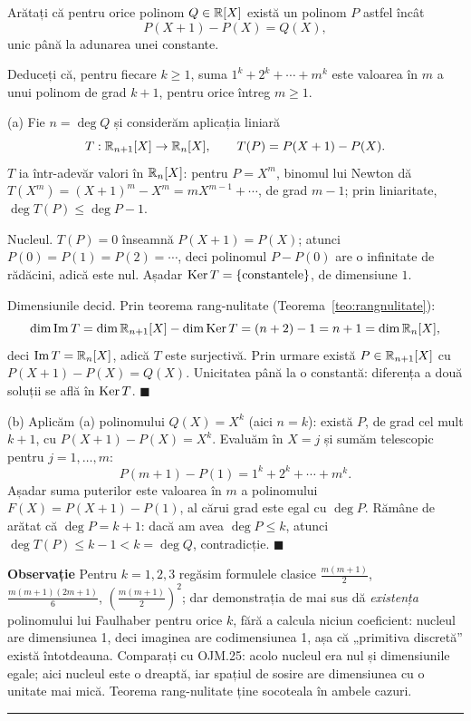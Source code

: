 \begin{parti}
\item Arătați că pentru orice polinom $Q \in \mathbb{R}[X]$ există un polinom $P$ astfel încât
\[
P(X+1) - P(X) = Q(X),
\]
unic până la adunarea unei constante.

\item Deduceți că, pentru fiecare $k \geq 1$, suma $1^k + 2^k + \cdots + m^k$ este valoarea în $m$ a unui polinom de grad $k+1$, pentru orice întreg $m \geq 1$.
\end{parti}
\sol (a) Fie $n = \deg Q$ și considerăm aplicația liniară
\[
T : \mathbb{R}_{n+1}[X] \to \mathbb{R}_n[X], \qquad T(P) = P(X+1) - P(X).
\]
$T$ ia într-adevăr valori în $\mathbb{R}_n[X]$: pentru $P = X^m$, binomul lui Newton dă $T(X^m) = (X+1)^m - X^m = mX^{m-1} + \cdots$, de grad $m-1$; prin liniaritate, $\deg T(P) \leq \deg P - 1$.

Nucleul. $T(P) = 0$ înseamnă $P(X+1) = P(X)$; atunci $P(0) = P(1) = P(2) = \cdots$, deci polinomul $P - P(0)$ are o infinitate de rădăcini, adică este nul. Așadar $\operatorname{Ker} T = \{\text{constantele}\}$, de dimensiune $1$.

Dimensiunile decid. Prin teorema rang-nulitate (Teorema~\ref{teo:rangnulitate}):
\[
\dim \operatorname{Im} T = \dim \mathbb{R}_{n+1}[X] - \dim \operatorname{Ker} T = (n+2) - 1 = n+1 = \dim \mathbb{R}_n[X],
\]
deci $\operatorname{Im} T = \mathbb{R}_n[X]$, adică $T$ este surjectivă. Prin urmare există $P \in \mathbb{R}_{n+1}[X]$ cu $P(X+1) - P(X) = Q(X)$. Unicitatea până la o constantă: diferența a două soluții se află în $\operatorname{Ker} T$. $\blacksquare$

(b) Aplicăm (a) polinomului $Q(X) = X^k$ (aici $n = k$): există $P$, de grad cel mult $k+1$, cu $P(X+1) - P(X) = X^k$. Evaluăm în $X = j$ și sumăm telescopic pentru $j = 1, \ldots, m$:
\[
P(m+1) - P(1) = 1^k + 2^k + \cdots + m^k .
\]
Așadar suma puterilor este valoarea în $m$ a polinomului $F(X) = P(X+1) - P(1)$, al cărui grad este egal cu $\deg P$. Rămâne de arătat că $\deg P = k+1$: dacă am avea $\deg P \leq k$, atunci $\deg T(P) \leq k-1 < k = \deg Q$, contradicție. $\blacksquare$

\medskip

\noindent\textbf{Observație} \quad Pentru $k = 1, 2, 3$ regăsim formulele clasice $\frac{m(m+1)}{2}$, $\frac{m(m+1)(2m+1)}{6}$, $\left(\frac{m(m+1)}{2}\right)^2$; dar demonstrația de mai sus dă \emph{existența} polinomului lui Faulhaber pentru orice $k$, fără a calcula niciun coeficient: nucleul are dimensiunea 1, deci imaginea are codimensiunea 1, așa că „primitiva discretă'' există întotdeauna. Comparați cu OJM.25: acolo nucleul era nul și dimensiunile egale; aici nucleul este o dreaptă, iar spațiul de sosire are dimensiunea cu o unitate mai mică. Teorema rang-nulitate ține socoteala în ambele cazuri.
\vspace{1mm}\hrule

